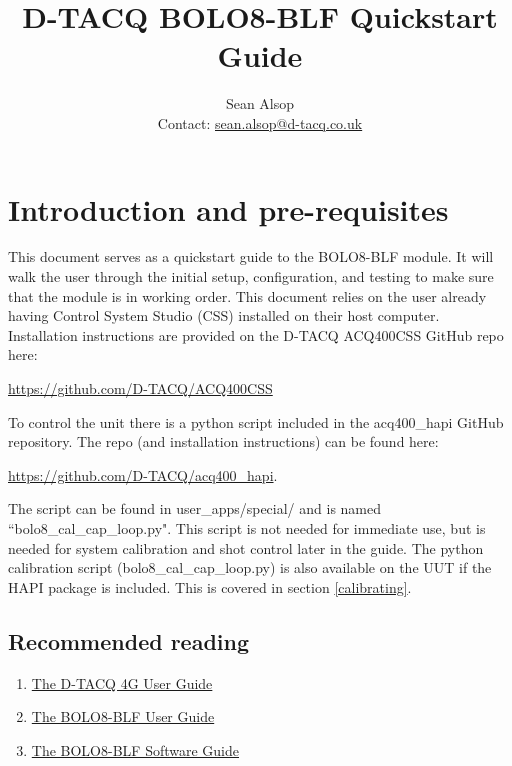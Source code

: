 \documentclass{article}
\begin{document}
\title{D-TACQ BOLO8-BLF Quickstart Guide}
\author{Sean Alsop \\ Contact: \href{mailto:sean.alsop@d-tacq.co.uk}{sean.alsop@d-tacq.co.uk} }

\maketitle


\tableofcontents

\section{Introduction and pre-requisites}
This document serves as a quickstart guide to the BOLO8-BLF module.
It will walk the user through the initial setup, configuration, and testing to make sure that the module is in working order.
This document relies on the user already having Control System Studio (CSS) installed on their host computer.
Installation instructions are provided on the \mbox{D-TACQ} ACQ400CSS GitHub repo here:
\newline
\centerline{ \href{https://github.com/D-TACQ/ACQ400CSS}{https://github.com/D-TACQ/ACQ400CSS} }
\newline
To control the unit there is a python script included in the acq400\_hapi GitHub repository.
The repo (and installation instructions) can be found here:
\newline
\centerline{ \href{https://github.com/D-TACQ/acq400_hapi}{https://github.com/D-TACQ/acq400\_hapi}. }
\newline
The script can be found in user\_apps/special/ and is named ``bolo8\_cal\_cap\_loop.py".
This script is not needed for immediate use, but is needed for system calibration and shot control later in the guide.
The python calibration script (bolo8\_cal\_cap\_loop.py) is also available on the UUT if the HAPI package is included.
This is covered in section \ref{calibrating}.

\subsection{Recommended reading}
\begin{enumerate}
	\item \href{http://www.d-tacq.com/resources/d-tacq-4G-acq4xx-UserGuide-r28.pdf}{The D-TACQ 4G User Guide}
	\item \href{http://www.d-tacq.com/resources/Bolo_calibration_report_user-guide.pdf}{The BOLO8-BLF User Guide}
	\item \href{https://github.com/seanalsop/bolodsp-doc/releases}{The BOLO8-BLF Software Guide}
\end{enumerate}
\end{document}
